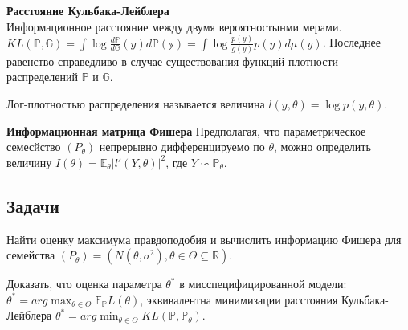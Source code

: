 \begin{definition} \textbf{Расстояние Кульбака-Лейблера}\\
Информационное расстояние между двумя вероятностынми мерами.\\
$KL(\mathbb{P}, \mathbb{G}) = \int \log \frac{d\mathbb{P}}{d\mathbb{G}}(y) d\mathbb{P(y)} = \int \log \frac{p(y)}{g(y)} p(y)d\mu (y)$. Последнее равенство справедливо в случае существования функций плотности распределений $\mathbb{P}$ и $\mathbb{G}$. 
\end{definition}

\begin{definition} Лог-плотностью распределения называется величина $l(y, \theta) = \log p(y, \theta)$.
\end{definition}

\begin{definition} \textbf{Информационная матрица Фишера}
Предполагая, что параметрическое семесйство $(P_{\theta})$ непрерывно дифференцируемо по $\theta$, можно определить величину $I(\theta) = \mathbb{E}_{\theta}|l'(Y, \theta)|^2$, где $Y \backsim \mathbb{P}_{\theta}$.
\end{definition}

\subsection{Задачи}
\begin{problem} Найти оценку максимума правдоподобия и вычислить информацию Фишера для семейства $(P_{\theta}) = (N(\theta, \sigma^2), \theta \in \Theta \subseteq \mathbb{R})$.
\end{problem}

\begin{problem}
Доказать, что оценка параметра $\theta^*$ в мисспецифицированной модели: $\theta^* = arg\max_{\theta \in \Theta} \mathbb{E}_{\mathbb{P} }L(\theta)$, эквивалентна минимизации расстояния Кульбака-Лейблера $\theta^* = arg\min_{\theta \in \Theta} KL(\mathbb{P}, \mathbb{P_{\theta}})$.
\begin{ordre}

\end{ordre}

\end{problem}

